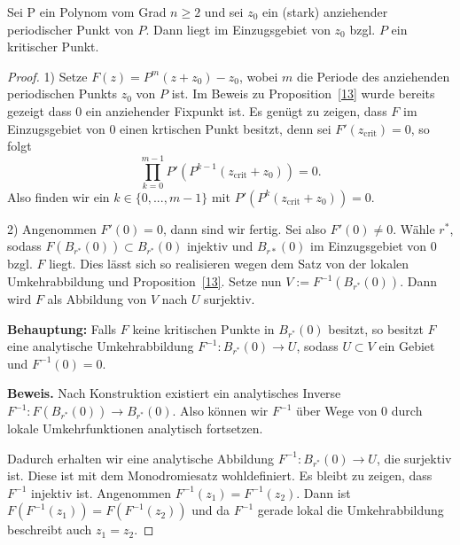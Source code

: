 \documentclass{mywork}
\begin{document}
\begin{thm} \label{last}
Sei P ein Polynom vom Grad $n\ge 2$ und sei $z_0$ ein (stark) anziehender periodischer Punkt von $P$. Dann liegt im Einzugsgebiet von $z_0$ bzgl. $P$ ein kritischer Punkt.
\end{thm}

\begin{proof}
1) Setze $F(z)=P^m(z+z_0)-z_0$, wobei $m$ die Periode des anziehenden periodischen Punkts $z_0$ von $P$ ist. Im Beweis zu Proposition~\ref{13} wurde bereits gezeigt dass $0$ ein anziehender Fixpunkt ist.  Es genügt zu zeigen, dass $F$ im Einzugsgebiet von $0$ einen krtischen Punkt besitzt, denn sei $F'(z_{\mathrm{crit}})=0$, so folgt
\[
	\prod_{k=0}^{m-1} P'(P^{k-1}(z_{\mathrm{crit}}+z_0))=0.
\]
Also finden wir ein $k\in \{0,...,m-1\}$ mit $P'(P^k(z_{\mathrm{crit}}+z_0))=0$.

2) Angenommen $F'(0)=0$, dann sind wir fertig. Sei also $F'(0)\neq 0$. Wähle $r^*$, sodass $F(B_{r^*}(0))\subset B_{r^*}(0)$ injektiv und $B_{r*}(0)$ im Einzugsgebiet von $0$ bzgl. $F$ liegt. Dies lässt sich so realisieren wegen dem Satz von der lokalen Umkehrabbildung und Proposition~\ref{13}. Setze nun $V:=F^{-1}(B_{r^*}(0))$. Dann wird $F$ als Abbildung von $V$ nach $U$ surjektiv.

\textbf{Behauptung:} Falls $F$ keine kritischen Punkte in $B_{r^*}(0)$ besitzt, so besitzt $F$ eine analytische Umkehrabbildung $F^{-1}: B_{r^*}(0) \to U$, sodass $U\subset V$ ein Gebiet und $F^{-1}(0)=0$.

\textbf{Beweis.} Nach Konstruktion existiert ein analytisches Inverse $F^{-1}: F(B_{r^*}(0)) \to B_{r^*}(0)$. Also können wir $F^{-1}$ über Wege von $0$ durch lokale Umkehrfunktionen analytisch fortsetzen.

\begin{figure}[H]
\centering
{}
\end{figure}

Dadurch erhalten wir eine analytische Abbildung $F^{-1}: B_{r^*}(0) \to U$, die surjektiv ist. Diese ist mit dem Monodromiesatz wohldefiniert. Es bleibt zu zeigen, dass $F^{-1}$ injektiv ist. Angenommen $F^{-1}(z_1)=F^{-1}(z_2)$. Dann ist $F(F^{-1}(z_1))=F(F^{-1}(z_2))$ und da $F^{-1}$ gerade lokal die Umkehrabbildung beschreibt auch $z_1=z_2$.


\end{proof}
\end{document}
